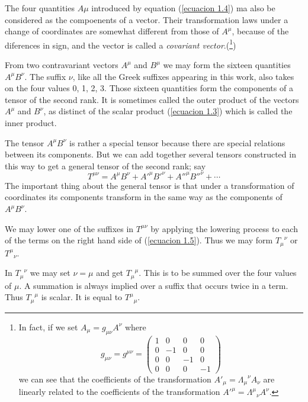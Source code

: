 The four quantities $A\mu$ introduced by equation (\ref{ecuacion 1.4}) ma also 
be considered as the compoenents of a vector. Their transformation laws under a 
change of coordinates are somewhat different from those of $A^\mu$, because of 
the diferences in sign, and the vector is called a \emph{covariant 
vector}.(\footnote{
In fact, if we set $A_\mu = g_{\mu\nu} A^\nu$ where
\[
  g_{\mu\nu} = 
  g^{\mu\nu} =
  \left(
    \begin{array}{cccc}
        1 &  0 &  0 &  0 \\
        0 & -1 &  0 &  0 \\
        0 &  0 & -1 &  0 \\
        0 &  0 &  0 & -1
    \end{array}
  \right)
\]
we can see that the coefficients of the transformation ${A'_{\mu}} = 
{\Lambda_\mu}^\nu A_\nu$ are linearly related to the coefficients of the 
transformation ${A'}^\mu = {\Lambda^\mu}_\nu A^\nu$.
})

From two contravariant vectors $A^\mu$ and $B^\mu$ we may form the sixteen 
quantities $A^\mu B^\nu$. The suffix $\nu$, like all the Greek suffixes 
appearing in this work, also takes on the four values 0, 1, 2, 3. Those sixteen 
quantities form the components of a tensor of the second rank. It is sometimes 
called the outer product of the vectors $A^\mu$ and $B^\nu$, as distinct of the 
scalar product (\ref{ecuacion 1.3}) which is called the inner product.

The tensor $A^\mu B^\nu$ is rather a special tensor because there are special 
relations between its components. But we can add together several tensors 
constructed in this way to get a general tensor of the second rank; say
\begin{equation}
 \label{ecuacion 1.5}
 T^{\mu\nu} = A^\mu B^\nu + {A'}^\mu {B'}^\nu + {A''}^\mu {B''}^\nu + \cdots
\end{equation}
The important thing about the general tensor is that under a transformation of 
coordinates its components transform in the same way as the components of $A^\mu 
B^\nu$.

We may lower one of the suffixes in $T^{\mu\nu}$ by applying the lowering 
process to each of the terms on the right hand side of (\ref{ecuacion 1.5}). 
Thus we may form ${T_\mu}^\nu$ or ${T^\mu}_\nu$.

In ${T_\mu}^\nu$ we may set $\nu=\mu$ and get ${T_\mu}^\mu$. This is to be 
summed over the four values of $\mu$. A summation is always implied over a 
suffix that occurs twice in a term. Thus ${T_\mu}^\mu$ is scalar. It is equal to 
${T^\mu}_\mu$.

